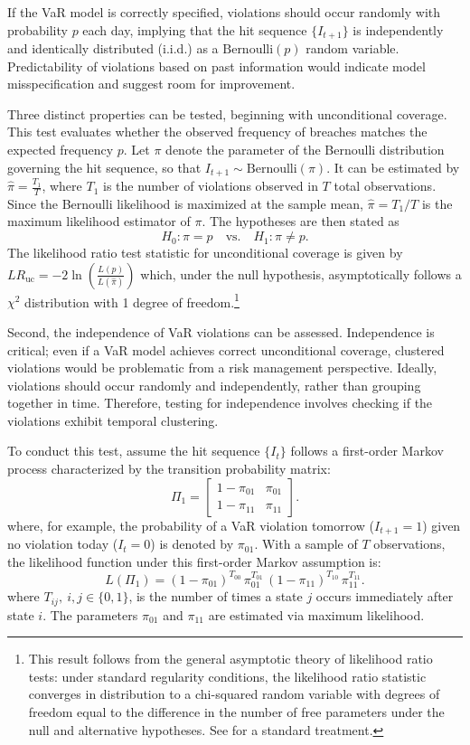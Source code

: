 If the VaR model is correctly specified, violations should occur randomly with probability $p$ each day, implying that the hit sequence $\{I_{t+1}\}$ is independently and identically distributed (i.i.d.) as a $\text{Bernoulli}(p)$ random variable. Predictability of violations based on past information would indicate model misspecification and suggest room for improvement.

Three distinct properties can be tested, beginning with unconditional coverage. This test evaluates whether the observed frequency of breaches matches the expected frequency $p$. Let $\pi$ denote the parameter of the Bernoulli distribution governing the hit sequence, so that $I_{t+1}\sim \text{Bernoulli}(\pi)$. It can be estimated by
$\hat{\pi} = \frac{T_1}{T}$,
where $T_1$ is the number of violations observed in $T$ total observations. Since the Bernoulli likelihood is maximized at the sample mean, $\hat{\pi}=T_1/T$ is the maximum likelihood estimator of $\pi$. The hypotheses are then stated as
\[H_0:\pi=p \quad \text{vs.} \quad H_1:\pi\neq p.\]
\newpage
The likelihood ratio test statistic for unconditional coverage is given by $LR_{\text{uc}} = -2 \ln\left( \frac{L(p)}{L(\hat{\pi})} \right)$ which, under the null hypothesis, asymptotically follows a $\chi^2$ distribution with 1 degree of freedom.\footnote{This result follows from the general asymptotic theory of likelihood ratio tests: under standard regularity conditions, the likelihood ratio statistic converges in distribution to a chi-squared random variable with degrees of freedom equal to the difference in the number of free parameters under the null and alternative hypotheses. See  for a standard treatment.}

Second, the independence of VaR violations can be assessed. Independence is critical; even if a VaR model achieves correct unconditional coverage, clustered violations would be problematic from a risk management perspective. Ideally, violations should occur randomly and independently, rather than grouping together in time. Therefore, testing for independence involves checking if the violations exhibit temporal clustering.

To conduct this test, assume the hit sequence $\{I_t\}$ follows a first-order Markov process characterized by the transition probability matrix:
\[
\Pi_1 =
\begin{bmatrix}
1 - \pi_{01} & \pi_{01} \\
1 - \pi_{11} & \pi_{11}
\end{bmatrix}.
\]
where, for example, the probability of a VaR violation tomorrow ($I_{t+1}=1$) given no violation today ($I_t=0$) is denoted by $\pi_{01}$. With a sample of $T$ observations, the likelihood function under this first-order Markov assumption is:
\[
L(\Pi_1) = (1 - \pi_{01})^{T_{00}} \, \pi_{01}^{T_{01}} \, (1 - \pi_{11})^{T_{10}} \, \pi_{11}^{T_{11}}.
\]
where $T_{ij}, \ i,j \in \{0,1\}$, is the number of times a state $j$ occurs immediately after state $i$.  The parameters $\pi_{01}$ and $\pi_{11}$ are estimated via maximum likelihood.

